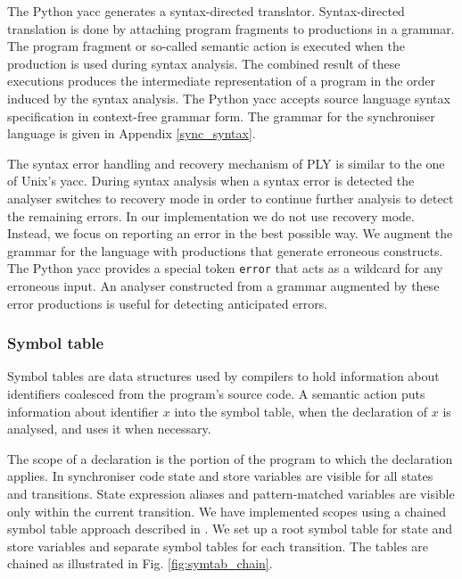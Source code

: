 The Python yacc generates a syntax-directed translator. Syntax-directed translation is done by attaching program fragments to productions in a grammar. The program fragment or so-called semantic action is executed when the production is used during syntax analysis. The combined result of these executions produces the intermediate representation of a program in the order induced by the syntax analysis. The Python yacc accepts source language syntax specification in context-free grammar form. The grammar for the synchroniser language is given in Appendix \ref{sync_syntax}.

The syntax error handling and recovery mechanism of PLY is similar to the one of Unix's yacc. During syntax analysis when a syntax error is detected the analyser switches to recovery mode in order to continue further analysis to detect the remaining errors. In our implementation we do not use recovery mode. Instead, we focus on reporting an error in the best possible way. We augment the grammar for the language with productions that generate erroneous constructs. The Python yacc provides a special token \texttt{error} that acts as a wildcard for any erroneous input. An analyser constructed from a grammar augmented by these error productions is useful for detecting anticipated errors.


  \subsubsection*{Symbol table}
Symbol tables are data structures used by compilers to hold information about identifiers coalesced from the program's source code. A semantic action puts information about identifier $x$ into the symbol table, when the declaration of $x$ is analysed, and uses it when necessary.

The scope of a declaration is the portion of the program to which the declaration applies. In synchroniser code state and store variables are visible for all states and transitions. State expression aliases and pattern-matched variables are visible only within the current transition. We have implemented scopes using a chained symbol table approach described in \cite{dragonbook}. We set up a root symbol table for state and store variables and separate symbol tables for each transition. The tables are chained as illustrated in Fig. \ref{fig:symtab_chain}.

